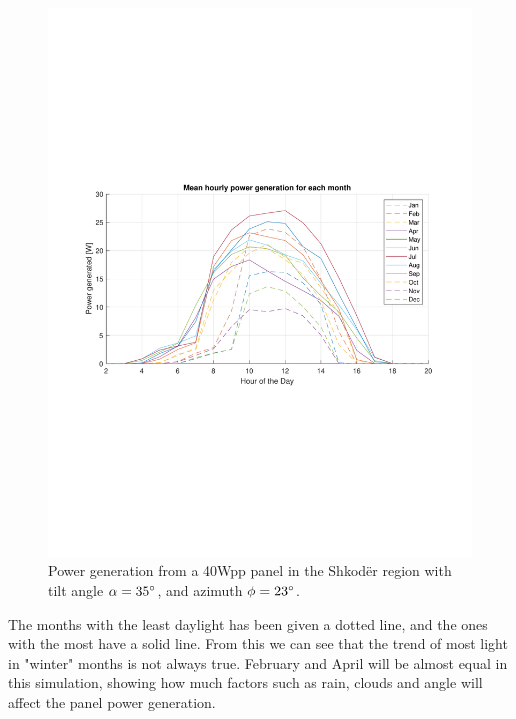\begin{figure}[H]
    \centering
    \includegraphics[width=\linewidth]{photos/Watt_generated_Shkoder.pdf}
    \caption{Power generation from a 40Wpp panel in the Shkodër region with tilt angle $\alpha=35\degree$, and azimuth $\phi=23\degree$.}
    \label{method:fig:wattage_generation_PV40wpp}
\end{figure}

The months with the least daylight has been given a dotted line, and the ones with the most have a solid line. From this we can see that the trend of most light in "winter" months is not always true. February and April will be almost equal in this simulation, showing how much factors such as rain, clouds and angle will affect the panel power generation. 

